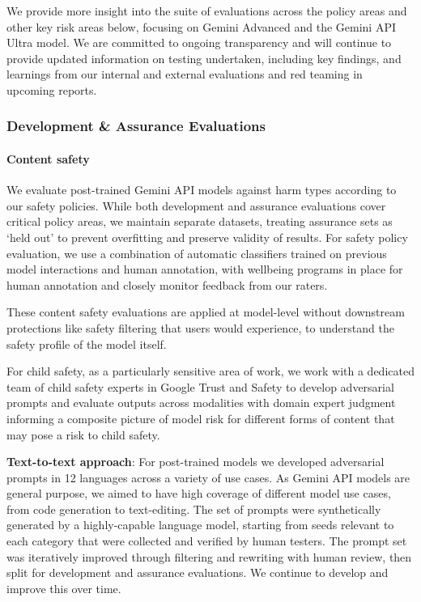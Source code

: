 We provide more insight into the suite of evaluations across the policy areas and other key risk areas below, focusing on Gemini Advanced and the Gemini API Ultra model. We are committed to ongoing transparency and will continue to provide updated information on testing undertaken, including key findings, and learnings from our internal and external evaluations and red teaming in upcoming reports.  

\subsubsection{Development \& Assurance Evaluations}

\paragraph{Content safety}

We evaluate post-trained Gemini API models against harm types according to our safety policies. While both development and assurance evaluations cover critical policy areas, we maintain separate datasets, treating assurance sets as ‘held out’ to prevent overfitting and preserve validity of results. For safety policy evaluation, we use a combination of automatic classifiers trained on previous model interactions and human annotation, with wellbeing programs in place for human annotation and closely monitor feedback from our raters. 

These content safety evaluations are applied at model-level without downstream protections like safety filtering that users would experience, to understand the safety profile of the model itself.

For child safety, as a particularly sensitive area of work, we work with a dedicated team of child safety experts in Google Trust and Safety to develop adversarial prompts and evaluate outputs across modalities with domain expert judgment informing a composite picture of model risk for different forms of content that may pose a risk to child safety.

\textbf{Text-to-text approach}: For post-trained models we developed adversarial prompts in 12 languages across a variety of use cases. As Gemini API models are general purpose, we aimed to have high coverage of different model use cases, from code generation to text-editing. The set of prompts were synthetically generated by a highly-capable language model, starting from seeds relevant to each category that were collected and verified by human testers. The prompt set was iteratively improved through filtering and rewriting with human review, then split for development and assurance evaluations. We continue to develop and improve this over time.

